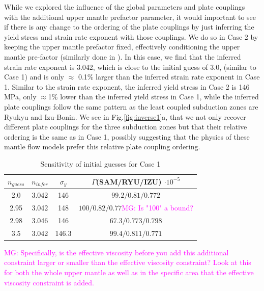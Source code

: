 \documentclass[12pt]{article}
\newcommand{\mgnote}[1]{\textcolor{magenta}{MG: #1}}
\begin{document}
	
While we explored the influence of the global parameters and plate couplings with the additional upper mantle prefactor parameter, it would important to see if there is any change to the ordering of the plate couplings by just inferring the yield stress and strain rate exponent with those couplings. We do so in Case 2 by  keeping the upper mantle prefactor fixed, effectively conditioning the upper mantle pre-factor (similarly done in \citep{ratnaswamy2015adjoint}). In this case, we find that the inferred strain rate exponent is 3.042, which is close to the initial guess of 3.0, (similar to Case 1) and is only $\approx$ 0.1\% larger than the inferred strain rate exponent in Case 1. Similar to the strain rate exponent, the inferred yield stress in Case 2 is 146 MPa, only $\approx$1\% lower than the inferred yield stress in Case 1, while the inferred plate couplings follow the same pattern as the least coupled subduction zones are Ryukyu and Izu-Bonin. We see in Fig.\ref{fig:inverse1}a, that we not only recover different plate couplings for the three subduction zones but that their relative ordering is the same as in Case 1, possibly suggesting that the physics of these mantle flow models prefer this relative plate coupling ordering. 

\begin{table}[H]
		\caption{Sensitivity of initial guesses for Case 1} %
		\centering  %
		\begin{tabular}{ c c c c } %
		\hline \hline                        %
		 $n_{guess}$ &$n_{infer}$ &$\sigma_y$&$\Gamma $(SAM/RYU/IZU) $\cdot 10^{-5}$   \\ [0.5ex] %
		\hline                  %
        	 2.0 &3.042 & 146 & $99.2/0.81/0.772$   \\
	         2.95 &3.042 & 148 & $100/0.82/0.77$\mgnote{Is "100" a bound?}    \\
	         2.98 &3.046 & 146 & $67.3/0.773/0.798$  \\
	        3.5 &3.042 & 146.3 & $99.4/0.811/0.771$  \\             
                \hline %
		\end{tabular}
		\label{table:initial_guess} %
		\end{table}



\mgnote{Specifically, is the effective viscosity before you add this additional constraint larger or smaller than the effective viscosity constraint? Look at this for both the whole upper mantle as well as in the specific area that the effective viscosity constraint is added.}
\end{document}
